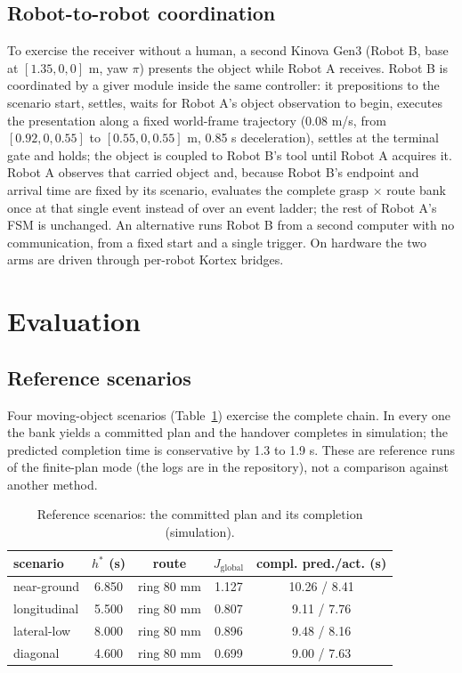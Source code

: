 \documentclass[conference]{IEEEtran}
\begin{document}
\subsection{Robot-to-robot coordination}\label{sec:two}
To exercise the receiver without a human, a second Kinova Gen3 (Robot B, base at $[1.35, 0, 0]$ m, yaw $\pi$) presents the object while Robot A receives. Robot B is coordinated by a giver module inside the same controller: it prepositions to the scenario start, settles, waits for Robot A's object observation to begin, executes the presentation along a fixed world-frame trajectory (0.08 m/s, from $[0.92, 0, 0.55]$ to $[0.55, 0, 0.55]$ m, 0.85 s deceleration), settles at the terminal gate and holds; the object is coupled to Robot B's tool until Robot A acquires it. Robot A observes that carried object and, because Robot B's endpoint and arrival time are fixed by its scenario, evaluates the complete grasp $\times$ route bank once at that single event instead of over an event ladder; the rest of Robot A's FSM is unchanged. An alternative runs Robot B from a second computer with no communication, from a fixed start and a single trigger. On hardware the two arms are driven through per-robot Kortex bridges.

\section{Evaluation}\label{sec:eval}

\subsection{Reference scenarios}
Four moving-object scenarios (Table~\ref{tab:ref}) exercise the complete chain. In every one the bank yields a committed plan and the handover completes in simulation; the predicted completion time is conservative by 1.3 to 1.9 s. These are reference runs of the finite-plan mode (the logs are in the repository), not a comparison against another method.

\begin{table}[t]\caption{Reference scenarios: the committed plan and its completion (simulation).}\label{tab:ref}\centering\small
\setlength{\tabcolsep}{4pt}\begin{tabular}{lcccc}\toprule
scenario & $h^*$ (s) & route & $J_{\mathrm{global}}$ & compl. pred./act. (s)\\\midrule
near-ground & 6.850 & ring 80 mm & 1.127 & 10.26 / 8.41\\
longitudinal & 5.500 & ring 80 mm & 0.807 & 9.11 / 7.76\\
lateral-low & 8.000 & ring 80 mm & 0.896 & 9.48 / 8.16\\
diagonal & 4.600 & ring 80 mm & 0.699 & 9.00 / 7.63\\\bottomrule
\end{tabular}\end{table}
\end{document}

